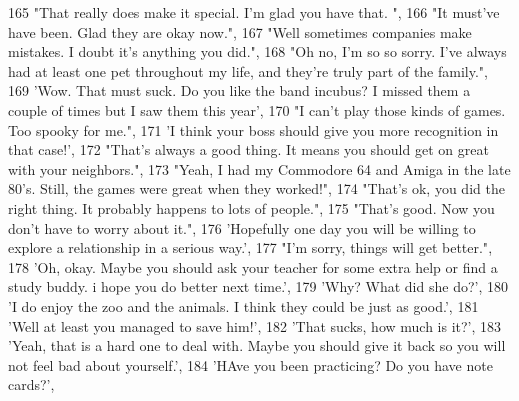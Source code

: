 \begin{DoxyCode}
165                             \textcolor{stringliteral}{"That really does make it special. I'm glad you have that. "},
166                             \textcolor{stringliteral}{"It must've have been. Glad they are okay now."},
167                             \textcolor{stringliteral}{"Well sometimes companies make mistakes. I doubt it's anything you did."},
168                             \textcolor{stringliteral}{"Oh no, I'm so so sorry. I've always had at least one pet throughout my life,
       and they're truly part of the family."},
169                             \textcolor{stringliteral}{'Wow. That must suck. Do you like the band incubus? I missed them a couple of
       times but I saw them this year'},
170                             \textcolor{stringliteral}{"I can't play those kinds of games. Too spooky for me."},
171                             \textcolor{stringliteral}{'I think your boss should give you more recognition in that case!'},
172                             \textcolor{stringliteral}{"That's always a good thing. It means you should get on great with your
       neighbors."},
173                             \textcolor{stringliteral}{"Yeah, I had my Commodore 64 and Amiga in the late 80's. Still, the games were
       great when they worked!"},
174                             \textcolor{stringliteral}{"That's ok, you did the right thing. It probably happens to lots of people."},
175                             \textcolor{stringliteral}{"That's good. Now you don't have to worry about it."},
176                             \textcolor{stringliteral}{'Hopefully one day you will be willing to explore a relationship in a serious
       way.'},
177                             \textcolor{stringliteral}{"I'm sorry, things will get better."},
178                             \textcolor{stringliteral}{'Oh, okay. Maybe you should ask your teacher for some extra help or find a
       study buddy. i hope you do better next time.'},
179                             \textcolor{stringliteral}{'Why? What did she do?'},
180                             \textcolor{stringliteral}{'I do enjoy the zoo and the animals. I think they could be just as good.'},
181                             \textcolor{stringliteral}{'Well at least you managed to save him!'},
182                             \textcolor{stringliteral}{'That sucks, how much is it?'},
183                             \textcolor{stringliteral}{'Yeah, that is a hard one to deal with.  Maybe you should give it back so you
       will not feel bad about yourself.'},
184                             \textcolor{stringliteral}{'HAve you been practicing? Do you have note cards?'},

\end{DoxyCode}
